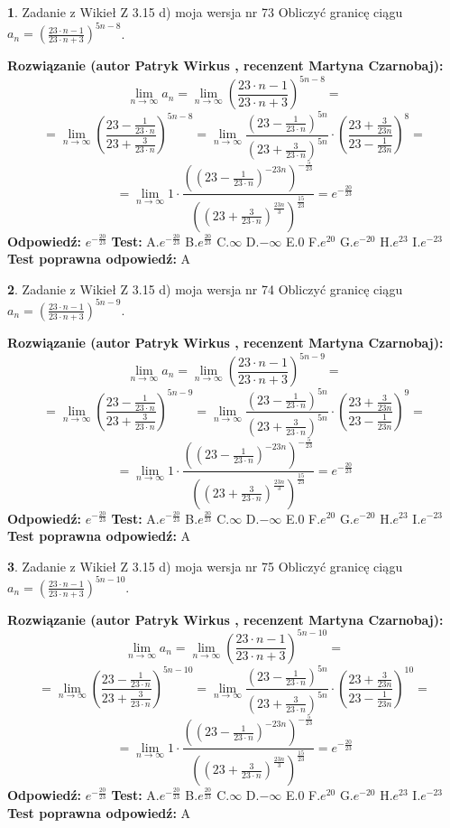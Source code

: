\documentclass[12pt, a4paper]{article}
\theoremstyle{definition} %
\newtheorem{zad}{}
\newcommand{\zadStart}[1]{\begin{zad}#1\newline}
\newcommand{\zadStop}{\end{zad}}
\newcommand{\rozwStart}[2]{\noindent \textbf{Rozwiązanie (autor #1 , recenzent #2): }\newline}
\newcommand{\rozwStop}{\newline}
\newcommand{\odpStart}{\noindent \textbf{Odpowiedź:}\newline}
\newcommand{\odpStop}{\newline}
\newcommand{\testStart}{\noindent \textbf{Test:}\newline}
\newcommand{\testStop}{\newline}
\newcommand{\kluczStart}{\noindent \textbf{Test poprawna odpowiedź:}\newline}
\newcommand{\kluczStop}{\newline}
\begin{document}
\zadStart{Zadanie z Wikieł Z 3.15 d) moja wersja nr 73}
Obliczyć granicę ciągu $a_{n}=(\frac{23\cdot n - 1}{23 \cdot n + 3})^{5n-8}$.
\zadStop
\rozwStart{Patryk Wirkus}{Martyna Czarnobaj}
$$\lim\limits_{n\to\infty} a_{n} = \lim\limits_{n\to\infty}(\frac{23\cdot n - 1}{23 \cdot n + 3})^{5n-8}=$$
$$=\lim\limits_{n\to\infty}(\frac{23 - \frac{1}{23\cdot n}}{23 + \frac{3}{23 \cdot n}})^{5n-8}=\lim\limits_{n\to\infty}\frac{(23 - \frac{1}{23\cdot n})^{5n}}{(23 + \frac{3}{23\cdot n})^{5n}} \cdot (\frac{23+\frac{3}{23n}}{23-\frac{1}{23n}})^{8}=$$
$$=\lim\limits_{n\to\infty} 1 \cdot \frac{((23-\frac{1}{23 \cdot n})^{-23n})^{-\frac{5}{23}}}{((23+\frac{3}{23 \cdot n})^{\frac{23n}{3}})^{\frac{15}{23}}} =e^{-\frac{20}{23}}$$
\rozwStop
\odpStart
$e^{-\frac{20}{23}}$
\odpStop
\testStart
A.$ e^{-\frac{20}{23}}$
B.$ e^{\frac{20}{23}}$
C.$\infty$
D.$-\infty$
E.$0$
F.$e^{20}$
G.$e^{-20}$
H.$e^{23}$
I.$e^{-23}$
\testStop
\kluczStart
A
\kluczStop



\zadStart{Zadanie z Wikieł Z 3.15 d) moja wersja nr 74}
Obliczyć granicę ciągu $a_{n}=(\frac{23\cdot n - 1}{23 \cdot n + 3})^{5n-9}$.
\zadStop
\rozwStart{Patryk Wirkus}{Martyna Czarnobaj}
$$\lim\limits_{n\to\infty} a_{n} = \lim\limits_{n\to\infty}(\frac{23\cdot n - 1}{23 \cdot n + 3})^{5n-9}=$$
$$=\lim\limits_{n\to\infty}(\frac{23 - \frac{1}{23\cdot n}}{23 + \frac{3}{23 \cdot n}})^{5n-9}=\lim\limits_{n\to\infty}\frac{(23 - \frac{1}{23\cdot n})^{5n}}{(23 + \frac{3}{23\cdot n})^{5n}} \cdot (\frac{23+\frac{3}{23n}}{23-\frac{1}{23n}})^{9}=$$
$$=\lim\limits_{n\to\infty} 1 \cdot \frac{((23-\frac{1}{23 \cdot n})^{-23n})^{-\frac{5}{23}}}{((23+\frac{3}{23 \cdot n})^{\frac{23n}{3}})^{\frac{15}{23}}} =e^{-\frac{20}{23}}$$
\rozwStop
\odpStart
$e^{-\frac{20}{23}}$
\odpStop
\testStart
A.$ e^{-\frac{20}{23}}$
B.$ e^{\frac{20}{23}}$
C.$\infty$
D.$-\infty$
E.$0$
F.$e^{20}$
G.$e^{-20}$
H.$e^{23}$
I.$e^{-23}$
\testStop
\kluczStart
A
\kluczStop



\zadStart{Zadanie z Wikieł Z 3.15 d) moja wersja nr 75}
Obliczyć granicę ciągu $a_{n}=(\frac{23\cdot n - 1}{23 \cdot n + 3})^{5n-10}$.
\zadStop
\rozwStart{Patryk Wirkus}{Martyna Czarnobaj}
$$\lim\limits_{n\to\infty} a_{n} = \lim\limits_{n\to\infty}(\frac{23\cdot n - 1}{23 \cdot n + 3})^{5n-10}=$$
$$=\lim\limits_{n\to\infty}(\frac{23 - \frac{1}{23\cdot n}}{23 + \frac{3}{23 \cdot n}})^{5n-10}=\lim\limits_{n\to\infty}\frac{(23 - \frac{1}{23\cdot n})^{5n}}{(23 + \frac{3}{23\cdot n})^{5n}} \cdot (\frac{23+\frac{3}{23n}}{23-\frac{1}{23n}})^{10}=$$
$$=\lim\limits_{n\to\infty} 1 \cdot \frac{((23-\frac{1}{23 \cdot n})^{-23n})^{-\frac{5}{23}}}{((23+\frac{3}{23 \cdot n})^{\frac{23n}{3}})^{\frac{15}{23}}} =e^{-\frac{20}{23}}$$
\rozwStop
\odpStart
$e^{-\frac{20}{23}}$
\odpStop
\testStart
A.$ e^{-\frac{20}{23}}$
B.$ e^{\frac{20}{23}}$
C.$\infty$
D.$-\infty$
E.$0$
F.$e^{20}$
G.$e^{-20}$
H.$e^{23}$
I.$e^{-23}$
\testStop
\kluczStart
A
\kluczStop
\end{document}
